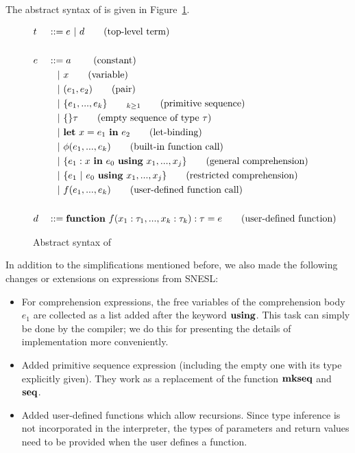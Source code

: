 The abstract syntax of \mysnesl is given in Figure~\ref{fig-mysnesl}. 
 

\begin{figure}[H]\large
	\begin{alignat*}{2}
	& t &&::= e \ | \ d  \tag{top-level term} \\
	\\
	& e &&::=  a \     \tag{constant} \\
	&   && \quad | \ x  \tag{variable} \\
	&   && \quad | \ (e_1,e_2) \tag{pair}\\
	&   && \quad | \ \{e_1,...,e_k \}_{\qquad k \ge 1}	\tag{primitive sequence} \\
	&   && \quad | \ \{ \}\tau			\tag{empty sequence of type $\tau$} \\
	&   && \quad | \ \mathbf{let} \ x = e_1 \ \mathbf{in} \ e_2 \tag{let-binding}\\
	&   && \quad | \ \phi{(e_1,...,e_k)}  \tag{built-in function call} \\
	&   && \quad | \ \{e_1 : x \ \mathbf{in} \ e_0 \ \mathbf{using} \ x_1,...,x_j\} \tag{general comprehension} \\
	&   && \quad | \ \{ e_1 \ | \ e_0 \ \mathbf{using} \ x_1,...,x_j \} \tag {restricted comprehension} \\
	&   && \quad | \ f(e_1,...,e_k)  \tag {user-defined function call} \\
	\\
	& d &&::= \mathbf{function} \  f(x_1: \tau_1, ..., x_k: \tau_k): \tau = e  \tag{user-defined function}
	\end{alignat*}
	\caption{Abstract syntax of \mysnesl \label{fig-mysnesl}}
\end{figure}

In addition to the simplifications mentioned before, we also made the following changes or extensions on expressions from SNESL:

\begin{itemize}
	\item For comprehension expressions, the free variables of the comprehension body $e_1$ are collected as a list added after the keyword $\mathbf{using}$. This task can simply be done by the compiler; we do this for presenting the details of implementation more conveniently.
	
	\item Added primitive sequence expression (including the empty one with its type explicitly given). They work as a replacement of the function $\mathbf{mkseq}$ and $\mathbf{seq}$.
	
	\item Added user-defined functions which allow recursions. Since type inference is not incorporated in the interpreter, the types of  parameters and return values need to be provided when the user defines a function.
\end{itemize}


